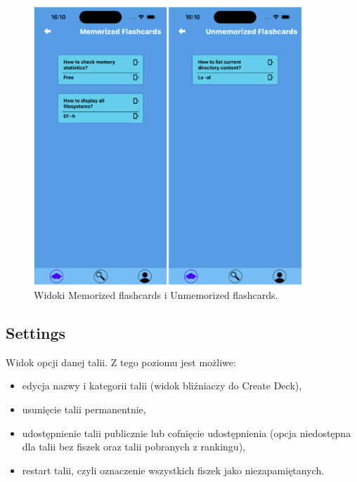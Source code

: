 \begin{figure}[H]
    \centering
    \includegraphics[width=0.9\textwidth]{chapters/chapter_10/images_mobile/mobile_memorized}
    \caption{Widoki Memorized flashcards i Unmemorized flashcards.}
    \label{img:mobile_memorized}
\end{figure}

\subsection{Settings}
Widok opcji danej talii. Z tego poziomu jest możliwe:
\begin{itemize}
    \item edycja nazwy i kategorii talii (widok bliźniaczy do Create Deck),
    \item usunięcie talii permanentnie,
    \item udostępnienie talii publicznie lub cofnięcie udostępnienia (opcja niedostępna dla talii bez fiszek oraz talii pobranych z rankingu),
    \item restart talii, czyli oznaczenie wszystkich fiszek jako niezapamiętanych.
\end{itemize}


